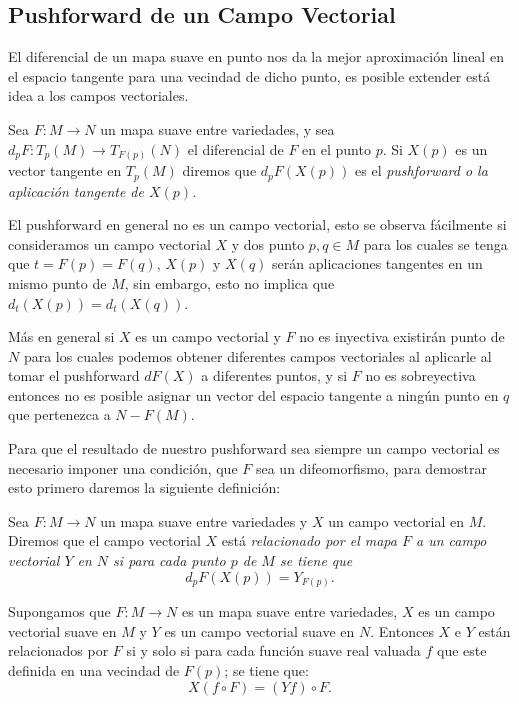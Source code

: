 \subsection{Pushforward de un Campo Vectorial}\label{Subsección: Pushforward de Campos Vectoriales}

El diferencial de un mapa suave en punto nos da la mejor aproximación lineal en el espacio tangente para una vecindad de dicho punto, es posible extender está idea a los campos vectoriales.

\begin{definition}[Pushforward]
	Sea $F: M \to N$ un mapa suave entre variedades, y sea $d_pF: T_p(M) \to T_{F(p)}(N)$ el diferencial de $F$ en el punto $p$. Si $X(p)$ es un vector tangente en $T_p(M)$ diremos que $d_{p}F(X(p))$ es el \it{pushforward} o la \it{aplicación tangente} de $X(p)$.
\end{definition}

El pushforward en general no es un campo vectorial, esto se observa fácilmente si consideramos un campo vectorial $X$ y dos punto $p,q \in M$ para los cuales se tenga que $t = F(p) = F(q)$, $X(p)$ y $X(q)$ serán aplicaciones tangentes en un mismo punto de $M$, sin embargo, esto no implica que $d_t(X(p)) = d_t(X(q))$.

Más en general si $X$ es un campo vectorial y $F$ no es inyectiva existirán punto de $N$ para los cuales podemos obtener diferentes campos vectoriales al aplicarle al tomar el pushforward $dF(X)$ a diferentes puntos, y si $F$ no es sobreyectiva entonces no es posible asignar un vector del espacio tangente a ningún punto en $q$ que pertenezca a $N - F(M)$.

Para que el resultado de nuestro pushforward sea siempre un campo vectorial es necesario imponer una condición, que $F$ sea un difeomorfismo, para demostrar esto primero daremos la siguiente definición:

\begin{definition}
	Sea $F: M \to N$ un mapa suave entre variedades y $X$ un campo vectorial en $M$. Diremos que el campo vectorial $X$ está \it{relacionado por el mapa $F$} a un campo vectorial $Y$ en $N$ si para cada punto $p$ de $M$ se tiene que
	\[
		d_pF(X(p)) = Y_{F(p)}.
	\]
\end{definition}

\begin{lemma}
	Supongamos que $F: M \to N$ es un mapa suave entre variedades, $X$ es un campo vectorial suave en $M$ y $Y$ es un campo vectorial suave en $N$. Entonces $X$ e $Y$ están relacionados por $F$ si y solo si para cada función suave real valuada $f$ que este definida en una vecindad de $F(p)$; se tiene que:
	\[
		X(f \circ F) = (Yf) \circ F.
	\]
\end{lemma}

